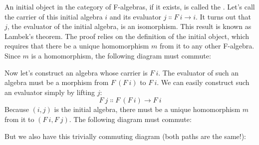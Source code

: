An initial object in the category of F-algebras, if it exists, is called
the . Let's call the carrier of this initial
algebra $i$ and its evaluator $j \Colon F\ i \to i$. It turns out that $j$,
the evaluator of the initial algebra, is an isomorphism. This result is
known as Lambek's theorem. The proof relies on the definition of the
initial object, which requires that there be a unique homomorphism
$m$ from it to any other F-algebra. Since $m$ is a
homomorphism, the following diagram must commute:

\begin{figure}[H]
\centering
{}
\end{figure}

\noindent
Now let's construct an algebra whose carrier is $F\ i$. The
evaluator of such an algebra must be a morphism from $F\ (F\ i)$
to $F\ i$. We can easily construct such an evaluator simply by
lifting $j$:
\[F\ j \Colon F\ (F\ i) \to F\ i\]
Because $(i, j)$ is the initial algebra, there must be a unique
homomorphism $m$ from it to $(F\ i, F\ j)$. The following
diagram must commute:

\begin{figure}[H]
\centering
{}
\end{figure}

\noindent
But we also have this trivially commuting diagram (both paths are the
same!):

\begin{figure}[H]
\centering
{}
\end{figure}

